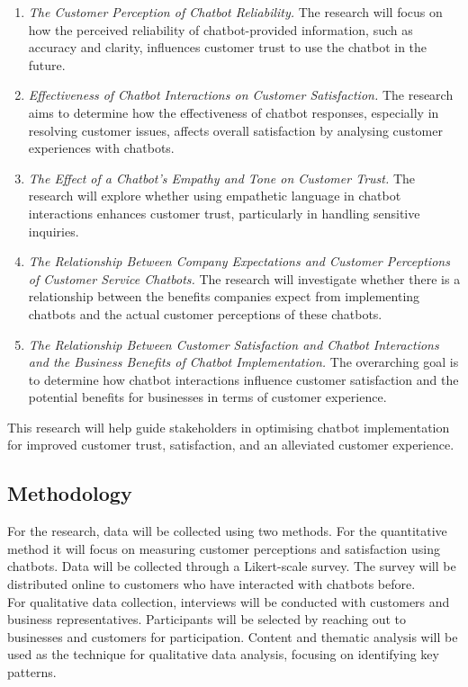 \documentclass[a4paper]{article}
\begin{document}
\begin{enumerate}
    \item \textit{The Customer Perception of Chatbot Reliability.}
    The research will focus on how the perceived reliability of chatbot-provided information, such as accuracy and clarity, influences customer trust to use the chatbot in the future.
    \item \textit{Effectiveness of Chatbot Interactions on Customer Satisfaction.} The research aims to determine how the effectiveness of chatbot responses, especially in resolving customer issues, affects overall satisfaction by analysing customer experiences with chatbots.
    \item \textit{The Effect of a Chatbot's Empathy and Tone on Customer Trust.} The research will explore whether using empathetic language in chatbot interactions enhances customer trust, particularly in handling sensitive inquiries.
    \item \textit{The Relationship Between Company Expectations and Customer Perceptions of Customer Service Chatbots.} The research will investigate whether there is a relationship between the benefits companies expect from implementing chatbots and the actual customer perceptions of these chatbots.
    \item \textit{The Relationship Between Customer Satisfaction and Chatbot Interactions and the Business Benefits of Chatbot Implementation.} The overarching goal is to determine how chatbot interactions influence customer satisfaction and the potential benefits for businesses in terms of customer experience.
\end{enumerate}
This research will help guide stakeholders in optimising chatbot implementation for improved customer trust, satisfaction, and an alleviated customer experience. 

\subsection{Methodology}
For the research, data will be collected using two methods. For the quantitative method it will 
focus on measuring customer perceptions and satisfaction using chatbots. Data will be collected through a Likert-scale survey. The survey will be distributed online to customers who have interacted with chatbots before.
\\
For qualitative data collection, interviews will be conducted with customers and business representatives. Participants will be selected by reaching out to businesses and customers for participation. Content and thematic analysis will be used as the technique for qualitative data analysis, focusing on identifying key patterns.
\end{document}
